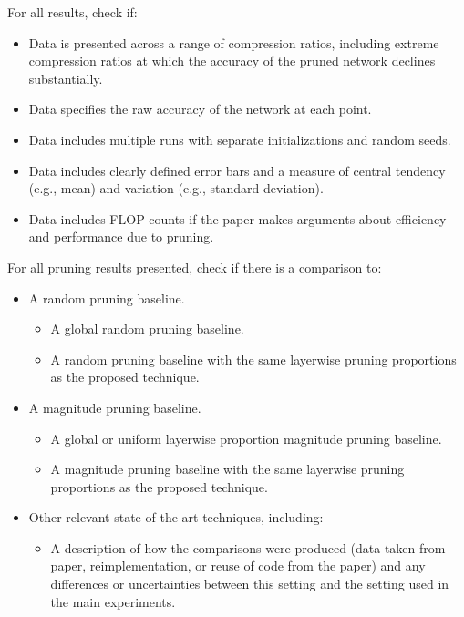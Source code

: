 \noindent For all results, check if:
\begin{itemize}
\item Data is presented across a range of compression ratios, including extreme compression ratios at which the accuracy of the pruned network declines substantially.
\item Data specifies the raw accuracy of the network at each point.
\item Data includes multiple runs with separate initializations and random seeds.
\item Data includes clearly defined error bars and a measure of central tendency (e.g., mean) and variation (e.g., standard deviation).
\item Data includes FLOP-counts if the paper makes arguments about efficiency and performance due to pruning.
\end{itemize}

\noindent For all pruning results presented, check if there is a comparison to:
\begin{itemize}
\item A random pruning baseline.
    \begin{itemize}
    \item A global random pruning baseline.
    \item A random pruning baseline with the same layerwise pruning proportions as the proposed technique.
    \end{itemize}
\item A magnitude pruning baseline.
    \begin{itemize}
    \item A global or uniform layerwise proportion magnitude pruning baseline.
    \item A magnitude pruning baseline with the same layerwise pruning proportions as the proposed technique.
    \end{itemize}
\item Other relevant state-of-the-art techniques, including:
    \begin{itemize}
    \item A description of how the comparisons were produced (data taken from paper, reimplementation, or reuse of code from the paper) and any differences or uncertainties between this setting and the setting used in the main experiments.
    \end{itemize}
\end{itemize}
